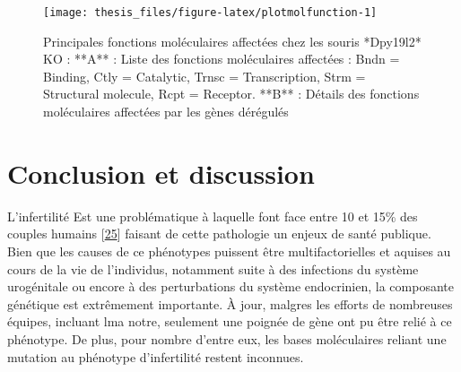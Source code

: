\documentclass[12pt,twoside]{reedthesis}
\begin{document}
  \newpage 
  
  \begin{figure}
  
  {\centering \texttt{[image: thesis\_files/figure-latex/plotmolfunction-1]} 
  
  }
  
  \caption[Principales fonctions moléculaires affectées chez les souris *Dpy19l2* KO]{Principales fonctions moléculaires affectées chez les souris *Dpy19l2* KO  :  **A** : Liste des fonctions moléculaires affectées : Bndn = Binding, Ctly = Catalytic, Trnsc = Transcription, Strm = Structural molecule, Rcpt = Receptor. **B** : Détails des fonctions moléculaires affectées par les gènes dérégulés}\label{fig:plotmolfunction}
  \end{figure}
  
  \chapter*{Conclusion et discussion}\label{conclusion-et-discussion}
  
  L'infertilité Est une problématique à laquelle font face entre 10 et
  15\% des couples humains {[}\protect\hyperlink{ref-Boivin2007a}{25}{]}
  faisant de cette pathologie un enjeux de santé publique. Bien que les
  causes de ce phénotypes puissent être multifactorielles et aquises au
  cours de la vie de l'individus, notamment suite à des infections du
  système urogénitale ou encore à des perturbations du système
  endocrinien, la composante génétique est extrêmement importante. À jour,
  malgres les efforts de nombreuses équipes, incluant lma notre, seulement
  une poignée de gène ont pu être relié à ce phénotype. De plus, pour
  nombre d'entre eux, les bases moléculaires reliant une mutation au
  phénotype d'infertilité restent inconnues.
  
\end{document}
